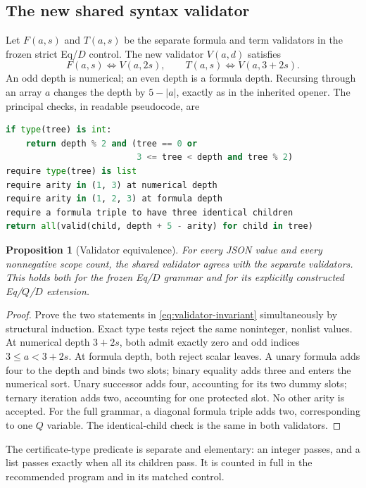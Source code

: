 \documentclass[11pt,letterpaper]{article}
\newtheorem{proposition}[theorem]{Proposition}
\theoremstyle{definition}\newtheorem{definition}[theorem]{Definition}
\theoremstyle{remark}\newtheorem{remark}[theorem]{Remark}
\begin{document}
\subsection{The new shared syntax validator}

Let $F(a,s)$ and $T(a,s)$ be the separate formula and term validators in
the frozen strict Eq/$D$ control. The new validator $V(a,d)$ satisfies
\[
 F(a,s)\iff V(a,2s),\qquad T(a,s)\iff V(a,3+2s).
 \tag{Scope invariant}\label{eq:validator-invariant}
\]
An odd depth is numerical; an even depth is a formula depth. Recursing
through an array $a$ changes the depth by $5-|a|$, exactly as in the
inherited opener. The principal checks, in readable pseudocode, are
\begin{lstlisting}[language=Python]
if type(tree) is int:
    return depth % 2 and (tree == 0 or
                          3 <= tree < depth and tree % 2)
require type(tree) is list
require arity in (1, 3) at numerical depth
require arity in (1, 2, 3) at formula depth
require a formula triple to have three identical children
return all(valid(child, depth + 5 - arity) for child in tree)
\end{lstlisting}

\begin{proposition}[Validator equivalence]\label{prop:validator}
For every JSON value and every nonnegative scope count, the shared
validator agrees with the separate validators. This holds both for
the frozen Eq/$D$ grammar and for its explicitly constructed Eq/$Q$/$D$
extension.
\end{proposition}
\begin{proof}
Prove the two statements in \eqref{eq:validator-invariant} simultaneously
by structural induction. Exact type tests reject the same noninteger,
nonlist values. At numerical depth $3+2s$, both admit exactly zero and
odd indices $3\le a<3+2s$. At formula depth, both reject scalar leaves.
A unary formula adds four to the depth and binds two slots; binary
equality adds three and enters the numerical sort. Unary successor adds
four, accounting for its two dummy slots; ternary iteration adds two,
accounting for one protected slot. No other arity is accepted. For the
full grammar, a diagonal formula triple adds two, corresponding to one
$Q$ variable. The identical-child check is the same in both validators.
\end{proof}

The certificate-type predicate is separate and elementary: an integer
passes, and a list passes exactly when all its children pass. It is
counted in full in the recommended program and in its matched control.
\end{document}
